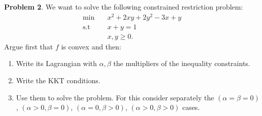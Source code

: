 \documentclass[a4paper]{article}
\newenvironment{problem}[2][Problem]
    { \begin{mdframed}[backgroundcolor=gray!20] \vspace*{0.1cm} \textbf{#1 #2}.}
    {  \end{mdframed}\vspace{0.3cm}}
\begin{document}
\begin{problem}{2}
We want to solve the following constrained restriction problem:
\begin{align*}
  \min \quad       & x^{2} + 2xy + 2y^2 - 3x + y \\
  \text{s.t} \quad & x + y = 1            \\
                   & x,y \geq 0.
\end{align*}
Argue first that \(f\) is convex and then:
\begin{enumerate}
  \item Write its Lagrangian with \(\alpha,\beta\) the multipliers of the inequality constraints.
  \item Write the KKT conditions.
  \item Use them to solve the problem. For this consider separately the \((\alpha = \beta = 0)\), \((\alpha > 0, \beta = 0)\), \((\alpha = 0, \beta > 0)\), \((\alpha > 0, \beta > 0)\) cases.
\end{enumerate}
\end{problem}
\end{document}
